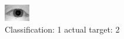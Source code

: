 \begin{figure}[h!]
\begin{center}
\includegraphics[width=0.60\columnwidth]{figures/ID927_class_1_target_2.png}
\end{center}
\caption{ Classification: 1 actual target: 2}
\label{fig:ID927_class_1_target_2}
\end{figure}
